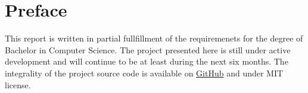 \chapter{Preface}
This report is written in partial fullfillment of the requiremenets for the degree of Bachelor in Computer Science. The project presented here is still under active development and will continue to be at least during the next six months. The integrality of the project source code is available on \href{https://github.com/tuvistavie/scala-x-server}{GitHub} and under MIT license.
